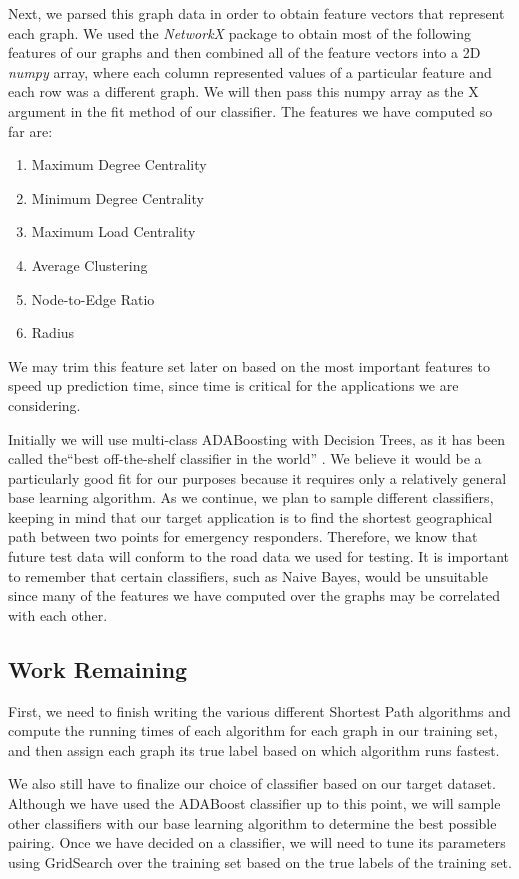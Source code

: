 \documentclass{article}
\begin{document}
Next, we parsed this graph data in order to obtain feature vectors that represent each graph. We used the \textit{NetworkX} package to obtain most of the following features of our graphs and then combined all of the feature vectors into a 2D \textit{numpy} array, where each column represented values of a particular feature and each row was a different graph. We will then pass this numpy array as the X argument in the fit method of our classifier. The features we have computed so far are:

\begin{enumerate}
\item Maximum Degree Centrality
\item Minimum Degree Centrality
\item Maximum Load Centrality
\item Average Clustering
\item Node-to-Edge Ratio
\item Radius
\end{enumerate}

We may trim this feature set later on based on the most important features to speed up prediction time, since time is critical for the applications we are considering.

Initially we will use multi-class ADABoosting with Decision Trees, as it has been called the``best off-the-shelf classifier in the world'' \cite{Zhu06}. We believe it would be a particularly good fit for our purposes because it requires only a relatively general base learning algorithm. As we continue, we plan to sample different classifiers, keeping in mind that our target application is to find the shortest geographical path between two points for emergency responders. Therefore, we know that future test data will conform to the road data we used for testing. It is important to remember that certain classifiers, such as Naive Bayes, would be unsuitable since many of the features we have computed over the graphs may be correlated with each other. 

\subsection{Work Remaining}
First, we need to finish writing the various different Shortest Path algorithms and compute the running times of each algorithm for each graph in our training set, and then assign each graph its true label based on which algorithm runs fastest.

We also still have to finalize our choice of classifier based on our target dataset. Although we have used the ADABoost classifier up to this point, we will sample other classifiers with our base learning algorithm to determine the best possible pairing. Once we have decided on a classifier, we will need to tune its parameters using GridSearch over the training set based on the true labels of the training set. 
\end{document}
